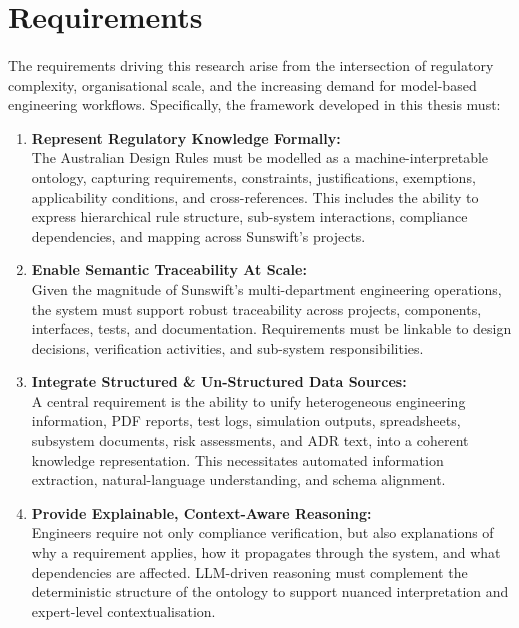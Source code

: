     \newpage
    \section{Requirements}

        \paragraph{} The requirements driving this research arise from the intersection of regulatory complexity, organisational scale, and the increasing demand for model-based engineering workflows. Specifically, the framework developed in this thesis must:

        \begin{enumerate}
          \item \textbf{Represent Regulatory Knowledge Formally:} \\ The Australian Design Rules must be modelled as a machine-interpretable ontology, capturing requirements, constraints, justifications, exemptions, applicability conditions, and cross-references. This includes the ability to express hierarchical rule structure, sub-system interactions, compliance dependencies, and mapping across Sunswift’s projects.
          \item \textbf{Enable Semantic Traceability At Scale:} \\ Given the magnitude of Sunswift’s multi-department engineering operations, the system must support robust traceability across projects, components, interfaces, tests, and documentation. Requirements must be linkable to design decisions, verification activities, and sub-system responsibilities.
          \item \textbf{Integrate Structured \& Un-Structured Data Sources:} \\ A central requirement is the ability to unify heterogeneous engineering information, PDF reports, test logs, simulation outputs, spreadsheets, subsystem documents, risk assessments, and ADR text, into a coherent knowledge representation. This necessitates automated information extraction, natural-language understanding, and schema alignment.
          \item \textbf{Provide Explainable, Context-Aware Reasoning:} \\ Engineers require not only compliance verification, but also explanations of why a requirement applies, how it propagates through the system, and what dependencies are affected. LLM-driven reasoning must complement the deterministic structure of the ontology to support nuanced interpretation and expert-level contextualisation.

\end{enumerate}
